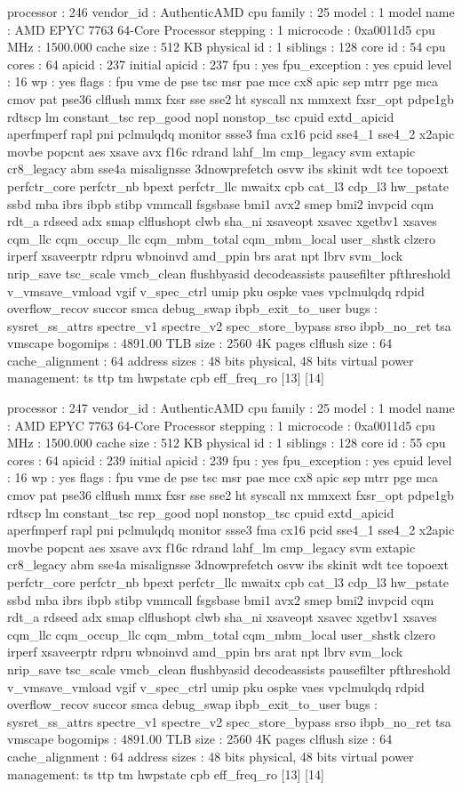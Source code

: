 processor	: 246
vendor_id	: AuthenticAMD
cpu family	: 25
model		: 1
model name	: AMD EPYC 7763 64-Core Processor
stepping	: 1
microcode	: 0xa0011d5
cpu MHz		: 1500.000
cache size	: 512 KB
physical id	: 1
siblings	: 128
core id		: 54
cpu cores	: 64
apicid		: 237
initial apicid	: 237
fpu		: yes
fpu_exception	: yes
cpuid level	: 16
wp		: yes
flags		: fpu vme de pse tsc msr pae mce cx8 apic sep mtrr pge mca cmov pat pse36 clflush mmx fxsr sse sse2 ht syscall nx mmxext fxsr_opt pdpe1gb rdtscp lm constant_tsc rep_good nopl nonstop_tsc cpuid extd_apicid aperfmperf rapl pni pclmulqdq monitor ssse3 fma cx16 pcid sse4_1 sse4_2 x2apic movbe popcnt aes xsave avx f16c rdrand lahf_lm cmp_legacy svm extapic cr8_legacy abm sse4a misalignsse 3dnowprefetch osvw ibs skinit wdt tce topoext perfctr_core perfctr_nb bpext perfctr_llc mwaitx cpb cat_l3 cdp_l3 hw_pstate ssbd mba ibrs ibpb stibp vmmcall fsgsbase bmi1 avx2 smep bmi2 invpcid cqm rdt_a rdseed adx smap clflushopt clwb sha_ni xsaveopt xsavec xgetbv1 xsaves cqm_llc cqm_occup_llc cqm_mbm_total cqm_mbm_local user_shstk clzero irperf xsaveerptr rdpru wbnoinvd amd_ppin brs arat npt lbrv svm_lock nrip_save tsc_scale vmcb_clean flushbyasid decodeassists pausefilter pfthreshold v_vmsave_vmload vgif v_spec_ctrl umip pku ospke vaes vpclmulqdq rdpid overflow_recov succor smca debug_swap ibpb_exit_to_user
bugs		: sysret_ss_attrs spectre_v1 spectre_v2 spec_store_bypass srso ibpb_no_ret tsa vmscape
bogomips	: 4891.00
TLB size	: 2560 4K pages
clflush size	: 64
cache_alignment	: 64
address sizes	: 48 bits physical, 48 bits virtual
power management: ts ttp tm hwpstate cpb eff_freq_ro [13] [14]

processor	: 247
vendor_id	: AuthenticAMD
cpu family	: 25
model		: 1
model name	: AMD EPYC 7763 64-Core Processor
stepping	: 1
microcode	: 0xa0011d5
cpu MHz		: 1500.000
cache size	: 512 KB
physical id	: 1
siblings	: 128
core id		: 55
cpu cores	: 64
apicid		: 239
initial apicid	: 239
fpu		: yes
fpu_exception	: yes
cpuid level	: 16
wp		: yes
flags		: fpu vme de pse tsc msr pae mce cx8 apic sep mtrr pge mca cmov pat pse36 clflush mmx fxsr sse sse2 ht syscall nx mmxext fxsr_opt pdpe1gb rdtscp lm constant_tsc rep_good nopl nonstop_tsc cpuid extd_apicid aperfmperf rapl pni pclmulqdq monitor ssse3 fma cx16 pcid sse4_1 sse4_2 x2apic movbe popcnt aes xsave avx f16c rdrand lahf_lm cmp_legacy svm extapic cr8_legacy abm sse4a misalignsse 3dnowprefetch osvw ibs skinit wdt tce topoext perfctr_core perfctr_nb bpext perfctr_llc mwaitx cpb cat_l3 cdp_l3 hw_pstate ssbd mba ibrs ibpb stibp vmmcall fsgsbase bmi1 avx2 smep bmi2 invpcid cqm rdt_a rdseed adx smap clflushopt clwb sha_ni xsaveopt xsavec xgetbv1 xsaves cqm_llc cqm_occup_llc cqm_mbm_total cqm_mbm_local user_shstk clzero irperf xsaveerptr rdpru wbnoinvd amd_ppin brs arat npt lbrv svm_lock nrip_save tsc_scale vmcb_clean flushbyasid decodeassists pausefilter pfthreshold v_vmsave_vmload vgif v_spec_ctrl umip pku ospke vaes vpclmulqdq rdpid overflow_recov succor smca debug_swap ibpb_exit_to_user
bugs		: sysret_ss_attrs spectre_v1 spectre_v2 spec_store_bypass srso ibpb_no_ret tsa vmscape
bogomips	: 4891.00
TLB size	: 2560 4K pages
clflush size	: 64
cache_alignment	: 64
address sizes	: 48 bits physical, 48 bits virtual
power management: ts ttp tm hwpstate cpb eff_freq_ro [13] [14]

